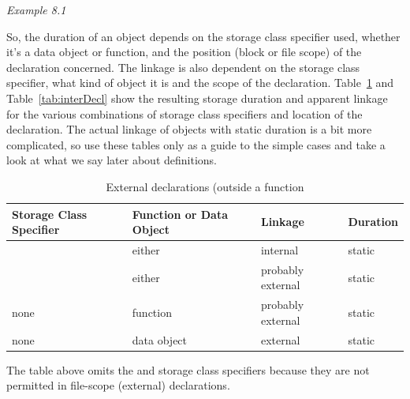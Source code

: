      \begin{center}\textit{Example 8.1}\end{center}


    So, the duration of an object depends on the storage class specifier
     used, whether it's a data object or function, and the position (block
     or file scope) of the declaration concerned. The linkage is also
     dependent on the storage class specifier, what kind of object it is and
     the scope of the declaration.
     Table~\ref{tab:extDecl} and Table~\ref{tab:interDecl}
     show the resulting storage duration and apparent linkage
     for the various combinations of storage class specifiers and location
     of the declaration. The actual linkage of objects with static duration
     is a bit more complicated, so use these tables only as a guide to the
     simple cases and take a look at what we say later about
     definitions.

     \begin{table}[htb]
       \centering
       \begin{tabular}{p{}p{}ll}
         \toprule
         Storage Class Specifier & Function or Data Object & Linkage & Duration \\
         \midrule
         \static{} & either      & internal          & static     \\
         \extern{} & either      & probably external & static     \\
         none            & function    & probably external & static     \\
         none            & data object & external          & static     \\
         \bottomrule
       \end{tabular}
       \caption{\label{tab:extDecl}External declarations (outside a function}
     \end{table}


    The table above omits the \register{} and \auto{}
     storage class specifiers because they are not permitted in file-scope
     (external) declarations.

